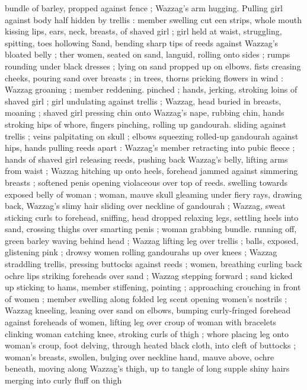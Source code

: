 bundle of barley, propped against fence ; Wazzag's arm hugging. 
Pulling girl against body half hidden by trellis : member swelling cut 
een strips, whole mouth kissing lips, ears, neck, breasts, of 
shaved girl ; girl held at waist, struggling, spitting, toes hollowing 
Sand, bending sharp tips of reeds against Wazzag's bloated belly ; 
ther women, seated on sand, languid, rolling onto sides ; rumps 
rounding under black dresses ; lying on sand propped up on elbows. 
fists creasing cheeks, pouring sand over breasts ; in trees, thorns 
pricking flowers in wind : Wazzag groaning ; member reddening. 
pinched ; hands, jerking, stroking loins of shaved girl ; girl 
undulating against trellis ; Wazzag, head buried in breasts, moaning 
; shaved girl pressing chin onto Wazzag's nape, rubbing chin, hands 
stroking hips of whore, fingers pinching, rolling up gandourah. 
sliding against trellis ; veins palpitating on skull ; elbows squeezing 
rolled-up gandourah against hips, hands pulling reeds apart : 
Wazzag's member retracting into pubic fleece ; hands of shaved girl 
releasing reeds, pushing back Wazzag's belly, lifting arms from waist 
; Wazzag hitching up onto heels, forehead jammed against simmering 
breasts ; softened penis opening violaceous over top of reeds. 
swelling towards exposed belly of woman ; woman, mauve skull 
gleaming under fiery rays, drawing back, Wazzag's slimy hair sliding 
over neckline of gandourah ; Wazzag, sweat sticking curls to 
forehead, sniffing, head dropped relaxing legs, settling heels into 
sand, crossing thighs over smarting penis ; woman grabbing bundle. 
running off, green barley waving behind head ; Wazzag lifting leg 
over trellis ; balls, exposed, glistening pink ; drowsy women rolling 
gandourahs up over knees ; Wazzag straddling trellis, pressing 
buttocks against reeds ; women, breathing curling back ochre lips 
striking foreheads over sand ; Wazzag stepping forward ; sand kicked 
up sticking to hams, member stiffening, pointing ; approaching 
crouching in front of women ; member swelling along folded leg 
scent opening women's nostrils ; Wazzag kneeling, leaning over sand 
on elbows, bumping curly-fringed forehead against foreheads of 
women, lifting leg over croup of woman with bracelets clinking 
woman catching knee, stroking curls of thigh ; whore placing leg 
onto woman's croup, foot delving, through heated black cloth, into 
cleft of buttocks ; woman's breasts, swollen, bulging over neckline 
hand, mauve above, ochre beneath, moving along Wazzag's thigh, up 
to tangle of long supple shiny hairs merging into curly fluff on thigh 
